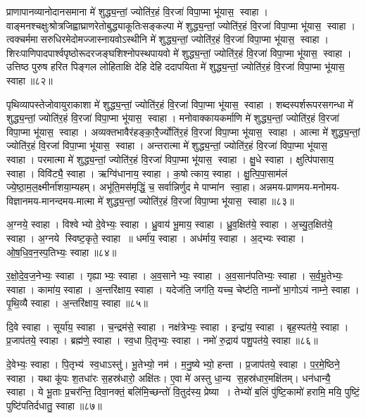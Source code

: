 प्राणापानव्यानोदानसमाना मे॑ शुद्ध्य॒न्तां॒ ज्योति॑र॒हं वि॒रजा॑ विपा॒प्मा भू॑यास॒ स्वाहा।
वाङ्मनश्चक्षुःश्रोत्रजिह्वाघ्राणरेतो\-बुद्ध्याकूतिः\-सङ्कल्पा मे॑ शुद्ध्य॒न्तां॒ ज्योति॑र॒हं वि॒रजा॑ विपा॒प्मा भू॑यास॒ स्वाहा। त्वक्चर्ममासरुधिरमेदोमज्जास्नायवो\-ऽस्थीनि  मे॑ शुद्ध्य॒न्तां॒ ज्योति॑र॒हं वि॒रजा॑ विपा॒प्मा भू॑यास॒ स्वाहा। शिरःपाणिपादपार्श्वपृष्ठोरूदरजङ्घशिश्नोपस्थपायवो  मे॑ शुद्ध्य॒न्तां॒ ज्योति॑र॒हं वि॒रजा॑ विपा॒प्मा भू॑यास॒ स्वाहा।
उत्तिष्ठ पुरुष हरित पिङ्गल लोहिताक्षि देहि देहि ददापयिता मे॑ शुद्ध्य॒न्तां॒ ज्योति॑र॒हं वि॒रजा॑ विपा॒प्मा भू॑यास॒ स्वाहा॥८२॥ \anuvakamend

पृथिव्यापस्तेजोवायुराकाशा मे॑ शुद्ध्य॒न्तां॒ ज्योति॑र॒हं वि॒रजा॑ विपा॒प्मा भू॑यास॒ स्वाहा। 
शब्दस्पर्शरूपरसगन्धा  मे॑ शुद्ध्य॒न्तां॒ ज्योति॑र॒हं वि॒रजा॑ विपा॒प्मा भू॑यास॒ स्वाहा। 
मनोवाक्कायकर्माणि  मे॑ शुद्ध्य॒न्तां॒ ज्योति॑र॒हं वि॒रजा॑ विपा॒प्मा भू॑यास॒ स्वाहा। 
अव्यक्तभावैर॑हङ्का॒रै॒र्ज्योति॑र॒हं वि॒रजा॑ विपा॒प्मा भू॑यास॒ स्वाहा। 
आत्मा मे॑ शुद्ध्य॒न्तां॒ ज्योति॑र॒हं वि॒रजा॑ विपा॒प्मा भू॑यास॒ स्वाहा। 
अन्तरात्मा मे॑ शुद्ध्य॒न्तां॒ ज्योति॑र॒हं वि॒रजा॑ विपा॒प्मा भू॑यास॒ स्वाहा। 
परमात्मा  मे॑ शुद्ध्य॒न्तां॒ ज्योति॑र॒हं वि॒रजा॑ विपा॒प्मा भू॑यास॒ स्वाहा। 
क्षु॒धे स्वाहा। क्षुत्पि॑पासाय॒ स्वाहा। विवि॑ट्यै॒ स्वाहा। ऋग्वि॑धानाय॒ स्वाहा। क॒षोत्काय॒ स्वाहा। क्षु॒त्पि॒पा॒साम॑लं ज्ये॒ष्ठा॒म॒ल॒क्ष्मीर्ना॑शया॒म्यहम्। अभू॑ति॒मस॑मृद्धिं॒ च॒ सर्वान्निर्णुद मे पाप्मा॑न स्वा॒हा।
अन्नमय-प्राणमय-मनोमय-विज्ञानमय-मानन्दमय-मात्मा मे॑ शुद्ध्य॒न्तां॒ ज्योति॑र॒हं वि॒रजा॑ विपा॒प्मा भू॑यास॒ स्वाहा॥८३॥
\anuvakamend

अ॒ग्नये॒ स्वाहा। विश्वेभ्यो दे॒वेभ्यः॒ स्वाहा। ध्रु॒वाय॑ भू॒माय॒ स्वाहा। ध्रु॒व॒क्षित॑ये॒ स्वाहा। अ॒च्यु॒त॒क्षित॑ये॒ स्वाहा। अ॒ग्नये स्विष्ट॒कृते॒ स्वाहा ॥ धर्मा॑य॒ स्वाहा। अध॑र्माय॒ स्वाहा। अ॒द्भ्यः स्वाहा। ओ॒ष॒धि॒व॒न॒स्प॒तिभ्यः॒ स्वाहा॥८४॥ 

र॒क्षो॒दे॒व॒ज॒नेभ्यः॒ स्वाहा। गृह्याभ्यः॒ स्वाहा। अ॒व॒सानेभ्यः॒ स्वाहा। अ॒व॒सान॑पतिभ्यः॒ स्वाहा। स॒र्व॒भू॒तेभ्यः॒ स्वाहा। कामा॑य॒ स्वाहा। अ॒न्तरि॑क्षाय॒ स्वाहा। यदेज॑ति॒ जग॑ति॒ यच्च॒ चेष्ट॑ति॒ नाम्नो॑ भा॒गोऽयं नाम्ने॒ स्वाहा। पृ॒थि॒व्यै स्वाहा। अ॒न्तरि॑क्षाय॒ स्वाहा॥८५॥ 

दि॒वे स्वाहा। सूर्या॑य॒ स्वाहा। च॒न्द्रम॑से॒ स्वाहा। नक्ष॑त्रेभ्यः॒ स्वाहा। इन्द्रा॑य॒ स्वाहा। बृह॒स्पत॑ये॒ स्वाहा। प्र॒जाप॑तये॒ स्वाहा। ब्रह्म॑णे॒ स्वाहा। स्व॒धा पि॒तृभ्यः॒ स्वाहा। नमो॑ रु॒द्राय॑ पशु॒पत॑ये॒ स्वाहा॥८६॥

  दे॒वेभ्यः॒ स्वाहा। पि॒तृभ्य॑ स्व॒धाऽस्तु॑। भू॒तेभ्यो॒ नम॑। म॒नु॒ष्येभ्यो॒ हन्ता। प्र॒जाप॑तये॒ स्वाहा। प॒र॒मे॒ष्ठिने॒ स्वाहा। यथा कू॑पः श॒तधा॑रः स॒हस्र॑धारो॒ अक्षि॑तः। ए॒वा मे॑ अस्तु धा॒न्य स॒हस्र॑धार॒मक्षि॑तम्। धन॑धान्यै॒ स्वाहा। ये भू॒ताः प्र॒चर॑न्ति॒ दिवा॒नक्तं॒ बलि॑मि॒च्छन्तो॑ वि॒तुद॑स्य॒ प्रेष्या। तेभ्यो॑ ब॒लिं पु॑ष्टि॒कामो॑ हरामि॒ मयि॒ पुष्टिं॒ पुष्टि॑पतिर्दधातु॒ स्वाहा॥८७॥ \anuvakamend

